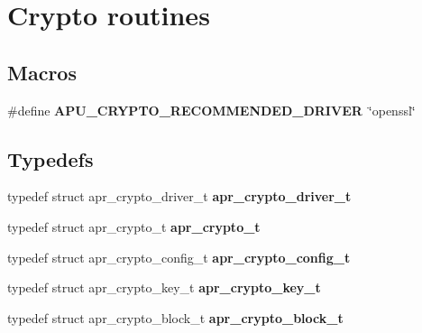 \hypertarget{group___a_p_r___util___crypto}{\section{Crypto routines}
\label{group___a_p_r___util___crypto}
}
\subsection*{Macros}
\begin{DoxyCompactItemize}
\item 
\hypertarget{group___a_p_r___util___crypto_gaa0fd79c7b12efb93d12ed63767cfcfb0}{\#define {\bfseries A\-P\-U\-\_\-\-C\-R\-Y\-P\-T\-O\-\_\-\-R\-E\-C\-O\-M\-M\-E\-N\-D\-E\-D\-\_\-\-D\-R\-I\-V\-E\-R}~\char`\"{}openssl\char`\"{}}\label{group___a_p_r___util___crypto_gaa0fd79c7b12efb93d12ed63767cfcfb0}

\end{DoxyCompactItemize}
\subsection*{Typedefs}
\begin{DoxyCompactItemize}
\item 
\hypertarget{group___a_p_r___util___crypto_ga9185b416f007dc01079c5a7e812767ab}{typedef struct apr\-\_\-crypto\-\_\-driver\-\_\-t {\bfseries apr\-\_\-crypto\-\_\-driver\-\_\-t}}\label{group___a_p_r___util___crypto_ga9185b416f007dc01079c5a7e812767ab}

\item 
\hypertarget{group___a_p_r___util___crypto_ga83bc88e4d9f7222320c49fd874646deb}{typedef struct apr\-\_\-crypto\-\_\-t {\bfseries apr\-\_\-crypto\-\_\-t}}\label{group___a_p_r___util___crypto_ga83bc88e4d9f7222320c49fd874646deb}

\item 
\hypertarget{group___a_p_r___util___crypto_gad853527ecf6bf2011f3df33d1b725ec1}{typedef struct apr\-\_\-crypto\-\_\-config\-\_\-t {\bfseries apr\-\_\-crypto\-\_\-config\-\_\-t}}\label{group___a_p_r___util___crypto_gad853527ecf6bf2011f3df33d1b725ec1}

\item 
\hypertarget{group___a_p_r___util___crypto_ga523c9ec387ef5261b43d234f7b1a8176}{typedef struct apr\-\_\-crypto\-\_\-key\-\_\-t {\bfseries apr\-\_\-crypto\-\_\-key\-\_\-t}}\label{group___a_p_r___util___crypto_ga523c9ec387ef5261b43d234f7b1a8176}

\item 
\hypertarget{group___a_p_r___util___crypto_gac75e3dfee18a940164adc12a639c01d0}{typedef struct apr\-\_\-crypto\-\_\-block\-\_\-t {\bfseries apr\-\_\-crypto\-\_\-block\-\_\-t}}\label{group___a_p_r___util___crypto_gac75e3dfee18a940164adc12a639c01d0}

\end{DoxyCompactItemize}
